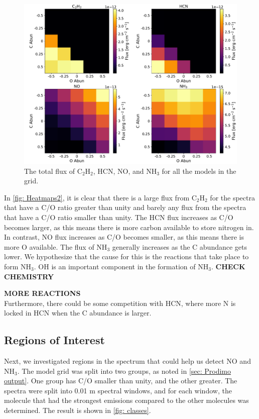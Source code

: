 \documentclass[oneside, single, authoryear, semicolon, 12pt]{lion-msc}
\newcommand{\4}{$_4$}
\newcommand{\3}{$_3$}
\newcommand{\2}{$_2$}
\begin{document}
\begin{figure}[H]
    \centering
    \includegraphics[width=\linewidth]{Figures/Heatmaps2.pdf}
    \caption{The total flux of C\2H\2, HCN, NO, and NH\3 for all the models in the grid.}
    \label{fig: Heatmaps2}
\end{figure}

In \autoref{fig: Heatmaps2}, it is clear that there is a large flux from C\2H\2 for the spectra that have a C/O ratio greater than unity and barely any flux from the spectra that have a C/O ratio smaller than unity. The HCN flux increases as C/O becomes larger, as this means there is more carbon available to store nitrogen in. In contrast, NO flux increases as C/O becomes smaller, as this means there is more O available. The flux of NH\3 generally increases as the C abundance gets lower. We hypothesize that the cause for this is the reactions that take place to form NH\3.
OH is an important component in the formation of NH\3. \textbf{CHECK CHEMISTRY}


\textbf{MORE REACTIONS}\\
Furthermore, there could be some competition with HCN, where more N is locked in HCN when the C abundance is larger. 

\subsection{Regions of Interest}
Next, we investigated regions in the spectrum that could help us detect NO and NH\3. The model grid was split into two groups, as noted in \autoref{sec: Prodimo output}. One group has C/O smaller than unity, and the other greater. The spectra were split into 0.01 \textmu m spectral windows, and for each window, the molecule that had the strongest emissions compared to the other molecules was determined. The result is shown in \autoref{fig: classes}.
\end{document}
